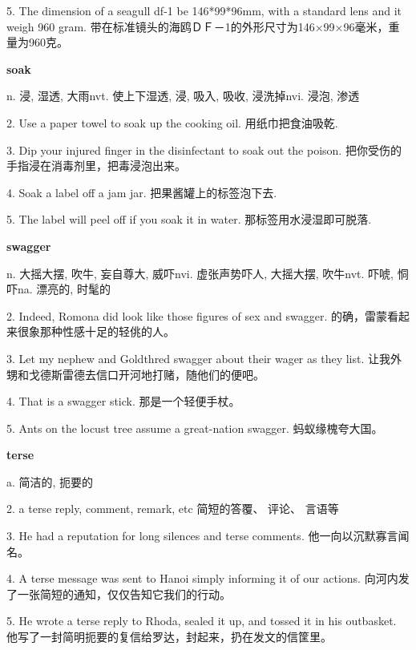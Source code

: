 \documentclass[12pt]{book}
\begin{document}
5.  The dimension of a seagull df-1 be 146*99*96mm, with a standard lens and it weigh 960 gram.  带在标准镜头的海鸥ＤＦ－1的外形尺寸为146×99×96毫米，重量为960克。 


\vspace{12pt}

\textbf{soak}

n. 浸, 湿透, 大雨nvt. 使上下湿透, 浸, 吸入, 吸收, 浸洗掉nvi. 浸泡, 渗透

2.  Use a paper towel to soak up the cooking oil.  用纸巾把食油吸乾. 


3.  Dip your injured finger in the disinfectant to soak out the poison.  把你受伤的手指浸在消毒剂里，把毒浸泡出来。 


4.  Soak a label off a jam jar.  把果酱罐上的标签泡下去. 


5.  The label will peel off if you soak it in water.  那标签用水浸湿即可脱落. 


\vspace{12pt}

\textbf{swagger}

n. 大摇大摆, 吹牛, 妄自尊大, 威吓nvi. 虚张声势吓人, 大摇大摆, 吹牛nvt. 吓唬, 恫吓na. 漂亮的, 时髦的

2.  Indeed, Romona did look like those figures of sex and swagger.  的确，雷蒙看起来很象那种性感十足的轻佻的人。 


3.  Let my nephew and Goldthred swagger about their wager as they list.  让我外甥和戈德斯雷德去信口开河地打赌，随他们的便吧。 


4.  That is a swagger stick.  那是一个轻便手杖。 


5.  Ants on the locust tree assume a great-nation swagger.  蚂蚁缘槐夸大国。 


\vspace{12pt}

\textbf{terse}

a. 简洁的, 扼要的

2.  a terse reply, comment, remark, etc  简短的答覆、 评论、 言语等 


3.  He had a reputation for long silences and terse comments.  他一向以沉默寡言闻名。 


4.  A terse message was sent to Hanoi simply informing it of our actions.  向河内发了一张简短的通知，仅仅告知它我们的行动。 


5.  He wrote a terse reply to Rhoda, sealed it up, and tossed it in his outbasket.  他写了一封简明扼要的复信给罗达，封起来，扔在发文的信筐里。 


\vspace{12pt}
\end{document}
